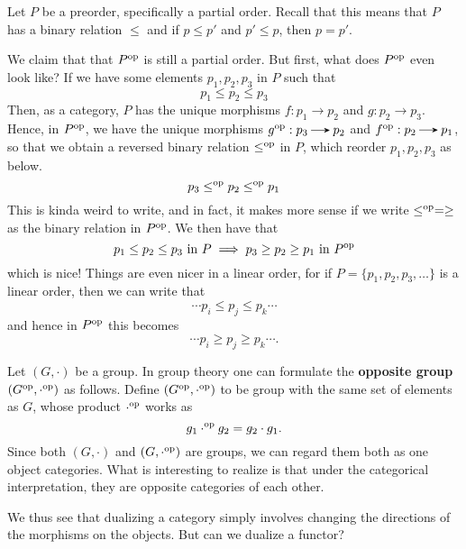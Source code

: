     \begin{example}
        Let $P$ be a preorder, specifically a partial order. 
        Recall that this means that $P$ has 
        a binary relation  $\le$ and if $p \le p'$
        and $p' \le p$, then $p = p'$. 
        
        We claim that that $P^{\mathrm{op}}$ is still a partial order. But first, 
        what does $P^{\mathrm{op}}$ even look like? If we have some elements $p_1, p_2, p_3$ in
        $P$ such that 
        \[
            p_1 \le p_2 \le p_3
        \]
        Then, as a category, $P$ has the unique morphisms $f: p_1 \to p_2$ and 
        $g: p_2 \to p_3$. Hence, in $P^{\mathrm{op}}$, we have the unique morphisms 
        $g\op : p_3 \to p_2$ and $f\op:p_2 \to p_1$, 
        so that we obtain a reversed binary relation $\le^{\mathrm{op}}$ in $P$, which 
        reorder $p_1, p_2, p_3$ as below.
        \[
            p_3 \le^{\mathrm{op}} p_2 \le^{\mathrm{op}} p_1
        \]
        This is kinda weird to write, and in fact, it makes 
        more sense if we 
        write $\le^{\mathrm{op}} = \ge$ as the binary relation in $P^{\mathrm{op}}$. We then have that 
        \[
            p_1 \le p_2 \le p_3 \text{ in } P 
            \implies p_3 \ge p_2 \ge p_1 \text{ in } P^{\mathrm{op}}
        \]
        which is nice!
        Things are even nicer in a linear order, for if $P = \{p_1,
        p_2, p_3, \dots \}$ is a linear order, then we can write that 
        \[
            \cdots p_i \le p_j \le p_k \cdots   
        \]
        and hence in $P^{\mathrm{op}}$ this becomes 
        \[
            \cdots p_i \ge p_j \ge p_k \cdots.
        \]
    \end{example}

    \begin{example}
        Let $(G, \cdot)$ be a group. 
        In group theory one can formulate the \textbf{opposite group} $(G^{\mathrm{op}}, \cdot^{\mathrm{op}})$ 
        as follows. Define
        $(G^{\mathrm{op}}, \cdot^{\mathrm{op}})$ to be group with the same set of elements as $G$, 
        whose product $\cdot^{\mathrm{op}}$ works as 
        \[
            g_1 \cdot^{\mathrm{op}} g_2 = g_2 \cdot g_1.   
        \]
        Since both $(G, \cdot)$ and $(G, \cdot^{\mathrm{op}})$ are groups, we can regard them both 
        as one object categories. What is interesting to realize is that under the 
        categorical interpretation, they are opposite categories of each other.
        
    \end{example}

    We thus see that dualizing a category simply involves changing the 
    directions of the morphisms  on the objects. But can we dualize a 
    functor?
    

